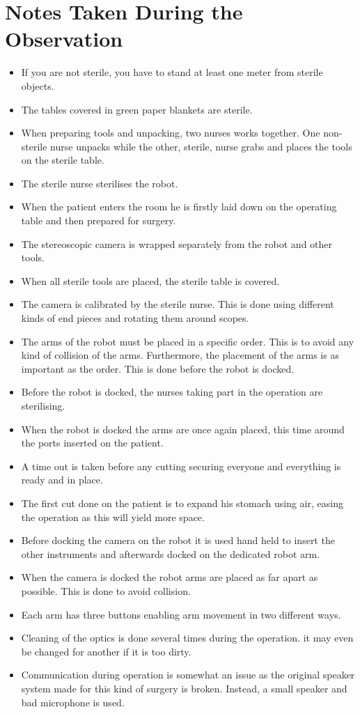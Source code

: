 \section*{Notes Taken During the Observation}
\begin{itemize}
	\item If you are not sterile, you have to stand at least one meter from sterile objects.
	\item The tables covered in green paper blankets are sterile.
	\item When preparing tools and unpacking, two nurses works together. One non-sterile nurse unpacks while the other, sterile, nurse grabs and places the tools on the sterile table.
	\item The sterile nurse sterilises the robot.
	\item When the patient enters the room he is firstly laid down on the operating table and then prepared for surgery.
	\item The stereoscopic camera is wrapped separately from the robot and other tools.
	\item When all sterile tools are placed, the sterile table is covered.
	\item The camera is calibrated by the sterile nurse. This is done using different kinds of end pieces and rotating them around scopes.
	\item The arms of the robot must be placed in a specific order. This is to avoid any kind of collision of the arms. Furthermore, the placement of the arms is as important as the order. This is done before the robot is docked.
	\item  Before the robot is docked, the nurses taking part in the operation are sterilising.
	\item When the robot is docked the arms are once again placed, this time around the ports inserted on the patient.
	\item A time out is taken before any cutting securing everyone and everything is ready and in place.
	\item The first cut done on the patient is to expand his stomach using air, easing the operation as this will yield more space.
	\item Before docking the camera on the robot it is used hand held to insert the other instruments and afterwards docked on the dedicated robot arm.
	\item When the camera is docked the robot arms are placed as far apart as possible. This is done to avoid collision.
	\item Each arm has three buttons enabling arm movement in two different ways.
	\item Cleaning of the optics is done several times during the operation. it may even be changed for another if it is too dirty.
	\item Communication during operation is somewhat an issue as the original speaker system made for this kind of surgery is broken. Instead, a small speaker and bad microphone is used.
\end{itemize}
